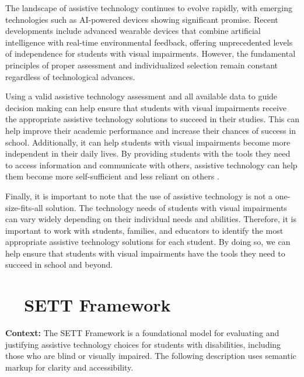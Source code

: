 The landscape of assistive technology continues to evolve rapidly, with emerging technologies such as AI-powered devices showing significant promise. Recent developments include advanced wearable devices that combine artificial intelligence with real-time environmental feedback, offering unprecedented levels of independence for students with visual impairments. However, the fundamental principles of proper assessment and individualized selection remain constant regardless of technological advances.

Using a valid assistive technology assessment and all available data to guide decision making can help ensure that students with visual impairments receive the appropriate assistive technology solutions to succeed in their studies. This can help improve their academic performance and increase their chances of success in school. Additionally, it can help students with visual impairments become more independent in their daily lives. By providing students with the tools they need to access information and communicate with others, assistive technology can help them become more self-sufficient and less reliant on others \supercite{WATI2010}.

Finally, it is important to note that the use of assistive technology is not a one-size-fits-all solution. The technology needs of students with visual impairments can vary widely depending on their individual needs and abilities. Therefore, it is important to work with students, families, and educators to identify the most appropriate assistive technology solutions for each student. By doing so, we can help ensure that students with visual impairments have the tools they need to succeed in school and beyond.

\section{~~SETT Framework}\label{app3:trouble41}

\noindent
\textbf{Context:} The SETT Framework is a foundational model for evaluating and justifying assistive technology choices for students with disabilities, including those who are blind or visually impaired. The following description uses semantic markup for clarity and accessibility.

